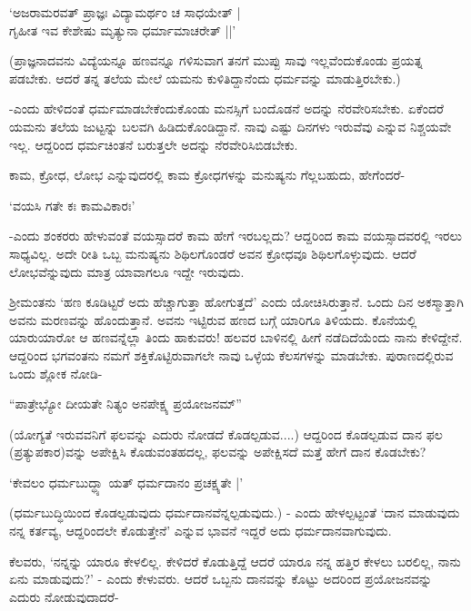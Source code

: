 \begin{shloka}
`ಅಜರಾಮರವತ್ ಪ್ರಾಜ್ಞಃ ವಿದ್ಯಾಮರ್ಥಂ ಚ ಸಾಧಯೇತ್ |\\
ಗೃಹೀತ ಇವ ಕೇಶೇಷು ಮೃತ್ಯುನಾ ಧರ್ಮಾಮಾಚರೇತ್ ||'
\end{shloka}

(ಪ್ರಾಜ್ಞನಾದವನು ವಿದ್ಯೆಯನ್ನೂ ಹಣವನ್ನೂ ಗಳಿಸುವಾಗ ತನಗೆ ಮುಪ್ಪು ಸಾವು ಇಲ್ಲವೆಂದುಕೊಂಡು ಪ್ರಯತ್ನ ಪಡಬೇಕು. ಆದರೆ ತನ್ನ ತಲೆಯ ಮೇಲೆ ಯಮನು ಕುಳಿತಿದ್ದಾನೆಂದು ಧರ್ಮವನ್ನು ಮಾಡುತ್ತಿರಬೇಕು.)

-ಎಂದು ಹೇಳಿದಂತೆ ಧರ್ಮಮಾಡಬೇಕೆಂದುಕೊಂಡು ಮನಸ್ಸಿಗೆ ಬಂದೊಡನೆ ಅದನ್ನು ನೆರವೇರಿಸಬೇಕು. ಏಕೆಂದರೆ ಯಮನು ತಲೆಯ ಜುಟ್ಟನ್ನು ಬಲವಗಿ ಹಿಡಿದುಕೊಂಡಿದ್ದಾನೆ. ನಾವು ಎಷ್ಟು ದಿನಗಳು ಇರುವೆವು ಎನ್ನುವ ನಿಶ್ಚಯವೇ ಇಲ್ಲ. ಆದ್ದರಿಂದ ಧರ್ಮಚಿಂತನೆ ಬರುತ್ತಲೇ ಅದನ್ನು ನೆರವೇರಿಸಿಬಿಡಬೇಕು.

ಕಾಮ, ಕ್ರೋಧ, ಲೋಭ ಎನ್ನುವುದರಲ್ಲಿ ಕಾಮ ಕ್ರೋಧಗಳನ್ನು ಮನುಷ್ಯನು ಗೆಲ್ಲಬಹುದು, ಹೇಗೆಂದರೆ-

\begin{shloka}
`ವಯಸಿ ಗತೇ ಕಃ ಕಾಮವಿಕಾರಃ'
\end{shloka}

-ಎಂದು ಶಂಕರರು ಹೇಳುವಂತೆ ವಯಸ್ಸಾದರೆ ಕಾಮ ಹೇಗೆ ಇರಬಲ್ಲದು? ಆದ್ದರಿಂದ ಕಾಮ ವಯಸ್ಸಾದವರಲ್ಲಿ ಇರಲು ಸಾಧ್ಯವಿಲ್ಲ. ಅದೇ ರೀತಿ ಒಬ್ಬ ಮನುಷ್ಯನು ಶಿಥಿಲಗೊಂಡರೆ ಅವನ ಕ್ರೋಧವೂ ಶಿಥಿಲಗೊಳ್ಳುವುದು. ಆದರೆ ಲೋಭವೆನ್ನುವುದು ಮಾತ್ರ ಯಾವಾಗಲೂ ಇದ್ದೇ ಇರುವುದು.

ಶ್ರೀಮಂತನು `ಹಣ ಕೂಡಿಟ್ಟರೆ ಅದು ಹೆಚ್ಚಾಗುತ್ತಾ ಹೋಗುತ್ತದೆ' ಎಂದು ಯೋಚಿಸಿರುತ್ತಾನೆ. ಒಂದು ದಿನ ಅಕಸ್ಮಾತ್ತಾಗಿ ಅವನು ಮರಣವನ್ನು ಹೊಂದುತ್ತಾನೆ. ಅವನು ಇಟ್ಟಿರುವ ಹಣದ ಬಗ್ಗೆ ಯಾರಿಗೂ ತಿಳಿಯದು. ಕೊನೆಯಲ್ಲಿ ಯಾರುಯಾರೋ ಆ ಹಣವನ್ನೆಲ್ಲಾ ತಿಂದು ಹಾಕುವರು! ಹಲವರ ಬಾಳಿನಲ್ಲಿ ಹೀಗೆ ನಡೆದಿದೆಯೆಂದು ನಾನು ಕೇಳಿದ್ದೇನೆ. ಆದ್ದರಿಂದ ಭಗವಂತನು ನಮಗೆ ಶಕ್ತಿಕೊಟ್ಟಿರುವಾಗಲೇ ನಾವು ಒಳ್ಳೆಯ ಕೆಲಸಗಳನ್ನು ಮಾಡಬೇಕು. ಪುರಾಣದಲ್ಲಿರುವ ಒಂದು ಶ್ಲೋಕ ನೋಡಿ-

\begin{shloka}
``ಪಾತ್ರೇಭ್ಯೋ ದೀಯತೇ ನಿತ್ಯಂ ಅನಪೇಕ್ಷ್ಯ ಪ್ರಯೋಜನಮ್''
\end{shloka}

(ಯೋಗ್ಯತೆ ಇರುವವನಿಗೆ ಫಲವನ್ನು ಎದುರು ನೋಡದೆ ಕೊಡಲ್ಪಡುವ....) ಆದ್ದರಿಂದ ಕೊಡಲ್ಪಡುವ ದಾನ ಫಲ (ಪ್ರತ್ಯುಪಕಾರ)ವನ್ನು ಅಪೇಕ್ಷಿಸಿ ಕೊಡುವಂತಹದಲ್ಲ, ಫಲವನ್ನು ಅಪೇಕ್ಷಿಸದೆ ಮತ್ತೆ ಹೇಗೆ ದಾನ ಕೊಡಬೇಕು?

\begin{shloka}
`ಕೇವಲಂ ಧರ್ಮಬುದ್ಧ್ಯಾ ಯತ್ ಧರ್ಮದಾನಂ ಪ್ರಚಕ್ಷ್ಯತೇ |'
\end{shloka}

(ಧರ್ಮಬುದ್ಧಿಯಿಂದ ಕೊಡಲ್ಪಡುವುದು ಧರ್ಮದಾನವೆನ್ನಲ್ಪಡುವುದು.) - ಎಂದು ಹೇಳಲ್ಪಟ್ಟಂತೆ `ದಾನ ಮಾಡುವುದು ನನ್ನ ಕರ್ತವ್ಯ, ಆದ್ದರಿಂದಲೇ ಕೊಡುತ್ತೇನೆ' ಎನ್ನುವ ಭಾವನೆ ಇದ್ದರೆ ಅದು ಧರ್ಮದಾನವಾಗುವುದು.

ಕೆಲವರು, `ನನ್ನನ್ನು ಯಾರೂ ಕೇಳಲಿಲ್ಲ. ಕೇಳಿದರೆ ಕೊಡುತ್ತಿದ್ದೆ ಆದರೆ ಯಾರೂ ನನ್ನ ಹತ್ತಿರ ಕೇಳಲು ಬರಲಿಲ್ಲ, ನಾನು ಏನು ಮಾಡುವುದು?' - ಎಂದು ಕೇಳುವರು. ಆದರೆ ಒಬ್ಬನು ದಾನವನ್ನು ಕೊಟ್ಟು ಅದರಿಂದ ಪ್ರಯೋಜನವನ್ನು ಎದುರು ನೋಡುವುದಾದರೆ-

